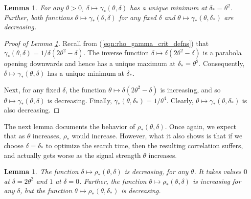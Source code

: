 \documentclass[12pt]{article}
\newtheorem{lemma}[theorem]{Lemma}      %
\begin{document}
\medskip

\begin{lemma}\label{lemma:gamma_star_behavior}
    For any $\theta>0$, $\delta\mapsto \gamma_*(\theta,\delta)$ has a unique minimum at $\delta_*=\theta^2$. Further, both functions $\theta\mapsto \gamma_*(\theta,\delta)$ for any fixed $\delta$ and $\theta\mapsto \gamma_*(\theta,\delta_*)$ are decreasing.
\end{lemma}

\begin{proof}[Proof of Lemma \ref{lemma:gamma_star_behavior}]
    Recall from (\ref{eqn:rho_gamma_crit_defns}) that $\gamma_*(\theta,\delta)=1/\delta(2\theta^2-\delta)$. The inverse function $\delta\mapsto \delta(2\theta^2-\delta)$ is a parabola opening downwards and hence has a unique maximum at $\delta_*=\theta^2$. Consequently, $\delta\mapsto\gamma_*(\theta,\delta)$ has a unique minimum at $\delta_*$.

    Next, for any fixed $\delta$, the function $\theta\mapsto \delta(2\theta^2-\delta)$ is increasing, and so $\theta\mapsto \gamma_*(\theta,\delta)$ is decreasing. Finally, $\gamma_*(\theta,\delta_*)=1/\theta^4$. Clearly, $\theta\mapsto \gamma_*(\theta,\delta_*)$ is also decreasing.
\end{proof}

\medskip

The next lemma documents the behavior of $\rho_*(\theta,\delta)$. Once again, we expect that as $\theta$ increases, $\rho_*$ would increase. However, what it also shows is that if we choose $\delta=\delta_*$ to optimize the search time, then the resulting correlation suffers, and actually gets worse as the signal strength $\theta$ increases.

\medskip

\begin{lemma}\label{lemma:rho_star_behavior}
    The function $\delta\mapsto\rho_*(\theta,\delta)$ is decreasing, for any $\theta$. It takes values $0$ at $\delta=2\theta^2$ and $1$ at $\delta=0$. Further, the function $\theta\mapsto \rho_*(\theta,\delta)$ is increasing for any $\delta$, but the function $\theta\mapsto \rho_*(\theta,\delta_*)$ is decreasing.
\end{lemma}
\end{document}
